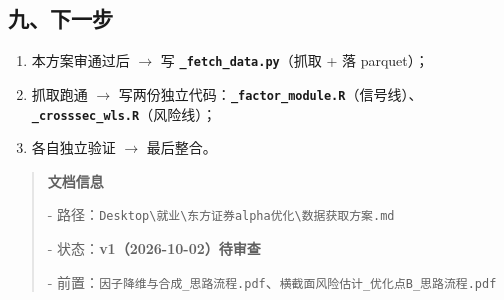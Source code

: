 \documentclass[11pt]{article}
\begin{document}
\subsection{\texorpdfstring{九、下一步}{九、下一步}}
\begin{enumerate}
  \item 本方案审通过后 \ensuremath{\rightarrow} 写 \textbf{\texttt{\_fetch\_data.py}}（抓取 + 落 parquet）；
  \item 抓取跑通 \ensuremath{\rightarrow} 写两份独立代码：\textbf{\texttt{\_factor\_module.R}}（信号线）、\textbf{\texttt{\_crosssec\_wls.R}}（风险线）；
  \item 各自独立验证 \ensuremath{\rightarrow} 最后整合。
\end{enumerate}
\begin{quote}
\textbf{文档信息}

- 路径：\texttt{Desktop\textbackslash{}就业\textbackslash{}东方证券alpha优化\textbackslash{}数据获取方案.md}

- 状态：\textbf{v1（2026-10-02）待审查}

- 前置：\texttt{因子降维与合成\_思路流程.pdf}、\texttt{横截面风险估计\_优化点B\_思路流程.pdf}
\end{quote}
\end{document}
